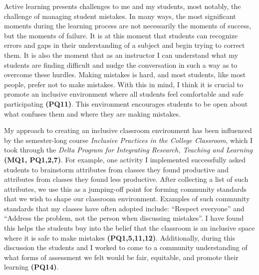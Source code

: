 \documentclass[11pt]{article}
\begin{document}
Active learning presents challenges to me and my students, most notably, the challenge of managing student mistakes. In many ways, the most significant moments during the learning process are not necessarily the moments of success, but the moments of failure. It is at this moment that students can recognize errors and gaps in their understanding of a subject and begin trying to correct them. It is also the moment that as an instructor I can understand what my students are finding difficult and nudge the conversation in such a way as to overcome these hurdles. Making mistakes is hard, and most students, like most people, prefer not to make mistakes. With this in mind, I think it is crucial to promote an inclusive environment where all students feel comfortable and safe participating \textbf{(PQ11)}. This environment encourages students to be open about what confuses them and where they are making mistakes. %

My approach to creating an inclusive classroom environment has been influenced by the semester-long course \textit{Inclusive Practices in the College Classroom}, which I took through the \textit{Delta Program for Integrating Research, Teaching and Learning} \textbf{(MQ1, PQ1,2,7)}. For example, one activity I implemented successfully asked students to brainstorm attributes from classes they found productive and attributes from classes they found less productive. After collecting a list of such attributes, we use this as a jumping-off point for forming community standards that we wish to shape our classroom environment. Examples of such community standards that my classes have often adopted include: ``Respect everyone'' and ``Address the problem, not the person when discussing mistakes''. I have found this helps the students buy into the belief that the classroom is an inclusive space where it is safe to make mistakes \textbf{(PQ1,5,11,12)}. Additionally, during this discussion the students and I worked to come to a community understanding of what forms of assessment we felt would be fair, equitable, and promote their learning \textbf{(PQ14)}.
\end{document}
